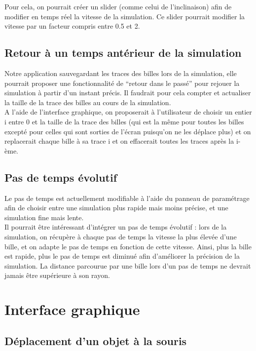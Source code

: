 \documentclass{report}
\begin{document}
Pour cela, on pourrait créer un slider (comme celui de l’inclinaison) afin de modifier en temps réel la vitesse de la simulation. Ce slider pourrait modifier la vitesse par un facteur compris entre 0.5 et 2.


\subsection{Retour à un temps antérieur de la simulation}

Notre application sauvegardant les traces des billes lors de la simulation, elle pourrait proposer une fonctionnalité de “retour dans le passé” pour rejouer la simulation à partir d’un instant précis. Il faudrait pour cela compter et actualiser la taille de la trace des billes au cours de la simulation. \\

A l’aide de l’interface graphique, on proposerait à l’utilisateur de choisir un entier i entre 0 et la taille de la trace des billes (qui est la même pour toutes les billes excepté pour celles qui sont sorties de l’écran puisqu’on ne les déplace plus) et on replacerait chaque bille à sa trace i et on effacerait toutes les traces après la i-ème.

\newpage
\subsection{Pas de temps évolutif}

Le pas de temps est actuellement modifiable à l’aide du panneau de paramétrage afin de choisir entre une simulation plus rapide mais moins précise, et une simulation fine mais lente. \\

Il pourrait être intéressant d’intégrer un pas de temps évolutif : lors de la simulation, on récupère à chaque pas de temps la vitesse la plus élevée d’une bille, et on adapte le pas de temps en fonction de cette vitesse. Ainsi, plus la bille est rapide, plus le pas de temps est diminué afin d’améliorer la précision de la simulation. La distance parcourue par une bille lors d’un pas de temps ne devrait jamais être supérieure à son rayon.

\section{Interface graphique}

\subsection{Déplacement d'un objet à la souris}
\end{document}
